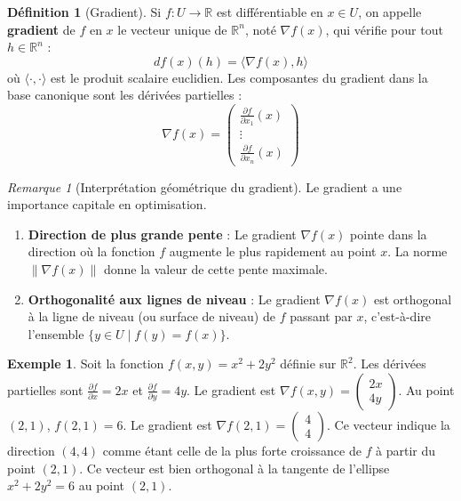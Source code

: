 \documentclass[a4paper,12pt,openany]{book}
\theoremstyle{plain}
\theoremstyle{definition}
\newtheorem{definition}[theorem]{Définition}
\newtheorem{example}[theorem]{Exemple}
\theoremstyle{remark}
\newtheorem{remark}[theorem]{Remarque}
\theoremstyle{nbstyle}
\newcommand{\R}{\mathbb{R}}
\newcommand{\norm}[1]{\left\lVert#1\right\rVert}
\newcommand{\grad}{\nabla}
\begin{document}
	\begin{definition}[Gradient]
		Si $f: U \to \R$ est différentiable en $x \in U$, on appelle \textbf{gradient} de $f$ en $x$ le vecteur unique de $\R^n$, noté $\grad f(x)$, qui vérifie pour tout $h \in \R^n$ :
		$$ df(x)(h) = \langle \grad f(x), h \rangle $$
		où $\langle \cdot, \cdot \rangle$ est le produit scalaire euclidien.
		Les composantes du gradient dans la base canonique sont les dérivées partielles :
		$$ \grad f(x) = \begin{pmatrix} \frac{\partial f}{\partial x_1}(x) \\ \vdots \\ \frac{\partial f}{\partial x_n}(x) \end{pmatrix} $$
	\end{definition}
	
	\begin{remark}[Interprétation géométrique du gradient]
		Le gradient a une importance capitale en optimisation.
		\begin{enumerate}
			\item \textbf{Direction de plus grande pente} : Le gradient $\grad f(x)$ pointe dans la direction où la fonction $f$ augmente le plus rapidement au point $x$. La norme $\norm{\grad f(x)}$ donne la valeur de cette pente maximale.
			\item \textbf{Orthogonalité aux lignes de niveau} : Le gradient $\grad f(x)$ est orthogonal à la ligne de niveau (ou surface de niveau) de $f$ passant par $x$, c'est-à-dire l'ensemble $\{y \in U \mid f(y) = f(x)\}$.
		\end{enumerate}
	\end{remark}
	
	\begin{example}
		Soit la fonction $f(x, y) = x^2 + 2y^2$ définie sur $\R^2$.
		Les dérivées partielles sont $\frac{\partial f}{\partial x} = 2x$ et $\frac{\partial f}{\partial y} = 4y$.
		Le gradient est $\grad f(x, y) = \begin{pmatrix} 2x \\ 4y \end{pmatrix}$.
		Au point $(2, 1)$, $f(2, 1) = 6$. Le gradient est $\grad f(2, 1) = \begin{pmatrix} 4 \\ 4 \end{pmatrix}$.
		Ce vecteur indique la direction $(4,4)$ comme étant celle de la plus forte croissance de $f$ à partir du point $(2,1)$. Ce vecteur est bien orthogonal à la tangente de l'ellipse $x^2 + 2y^2 = 6$ au point $(2,1)$.
	\end{example}
	
\end{document}

